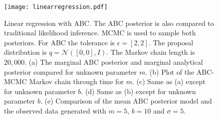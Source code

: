 \begin{figure}[H]	
	\centering
	\texttt{[image: linearregression.pdf]}
	\caption{Linear regression with ABC. The ABC posterior is also compared to traditional likelihood inference. MCMC is used to sample both posteriors. For ABC the tolerance is $\epsilon = [2,2]$. The proposal distribution is $q = \mathcal{N}([0,0],I)$. The Markov chain length is $20,000$. (a) The marginal ABC posterior and marginal analytical posterior compared for unknown parameter $m$. (b) Plot of the ABC-MCMC Markov chain through time for $m$. (c) Same as (a) except for unknown parameter $b$. (d) Same as (b) except for unknown parameter $b$. (e) Comparison of the mean ABC posterior model and the observed data generated with $m = 5$, $b = 10$ and $\sigma = 5$.}
	\label{linear-regression}
\end{figure}

